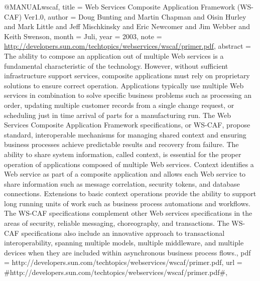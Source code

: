 @MANUAL{wscaf,
  title = {{Web Services Composite Application Framework (WS-CAF) Ver1.0}},
  author = {Doug Bunting and Martin Chapman and Oisin Hurley and Mark Little
	and Jeff Mischkinsky and Eric Newcomer and Jim Webber and Keith Swenson},
  month = {Juli},
  year = {2003},
  note = {\url{http://developers.sun.com/techtopics/webservices/wscaf/primer.pdf}},
  abstract = {The ability to compose an application out of
multiple Web services
	is a fundamental characteristic of the technology.
However, without
	sufficient infrastructure support services, composite
applications
	must rely on proprietary solutions to ensure correct
operation. Applications
	typically use multiple Web services in combination
to solve specific
	business problems such as processing an order,
updating multiple
	customer records from a single change request, or
scheduling just
	in time arrival of parts for a manufacturing run.
The Web Services
	Composite Application Framework specifications, or
WS-CAF, propose
	standard, interoperable mechanisms for managing shared
context and
	ensuring business processes achieve predictable results
and recovery
	from failure. The ability to share system information,
called context,
	is essential for the proper operation of applications
composed of
	multiple Web services. Context identifies a Web service
as part of
	a composite application and allows each Web service to
share information
	such as message correlation, security tokens, and
database connections.
	Extensions to basic context operations provide
the ability to support
	long running units of work such as business
process automations and
	workflows. The WS-CAF specifications complement
other Web services
	specifications in the areas of security, reliable
messaging, choreography,
	and transactions. The WS-CAF specifications also
include an innovative
	approach to transactional interoperability,
spanning multiple models,
	multiple middleware, and multiple devices
when they are included
	within asynchronous business process flows.},
  pdf = {http://developers.sun.com/techtopics/webservices/wscaf/primer.pdf},
  url = {#http://developers.sun.com/techtopics/webservices/wscaf/primer.pdf#},
}

